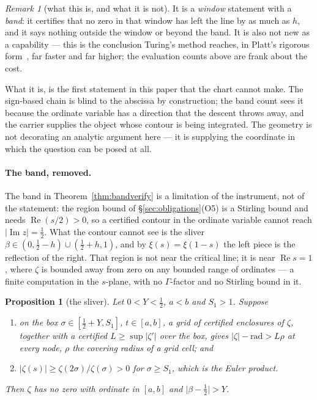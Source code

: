 \documentclass[11pt]{article}
\theoremstyle{plain}
\newtheorem{proposition}[theorem]{Proposition}
\theoremstyle{definition}
\theoremstyle{remark}
\newtheorem{remark}[theorem]{Remark}
\begin{document}
\begin{remark}[what this is, and what it is not]
It is a \emph{window} statement with a \emph{band}: it certifies that no zero in that
window has left the line by as much as $h$, and it says nothing outside the window or
beyond the band. It is also not new as a capability --- this is the conclusion Turing's
method reaches, in Platt's rigorous form~\cite{Platt2017}, far faster and far higher; the
evaluation counts above are frank about the cost.

What it is, is the first statement in this paper that the chart cannot make. The
sign-based chain is blind to the abscissa by construction; the band count sees it because
the ordinate variable has a direction that the descent throws away, and the carrier
supplies the object whose contour is being integrated. The geometry is not decorating an
analytic argument here --- it is supplying the coordinate in which the question can be
posed at all.
\end{remark}

\paragraph{The band, removed.} The band in Theorem~\ref{thm:bandverify} is a limitation of
the instrument, not of the statement: the region bound of \S\ref{sec:obligations}(O5) is a
Stirling bound and needs $\operatorname{Re}(s/2)>0$, so a certified contour in the ordinate
variable cannot reach $\lvert\operatorname{Im}z\rvert=\tfrac12$. What the contour cannot see
is the sliver $\beta\in(0,\tfrac12-h)\cup(\tfrac12+h,1)$, and by $\xi(s)=\xi(1-s)$ the left
piece is the reflection of the right. That region is not near the critical line; it is near
$\operatorname{Re}s=1$, where $\zeta$ is bounded away from zero on any bounded range of
ordinates --- a finite computation in the $s$-plane, with no $\Gamma$-factor and no Stirling
bound in it.

\begin{proposition}[the sliver]\label{prop:sliver}
Let $0<Y<\tfrac12$, $a<b$ and $S_1>1$. Suppose
\begin{enumerate}
\item[(a)] on the box $\sigma\in[\tfrac12+Y,S_1]$, $t\in[a,b]$, a grid of certified
enclosures of $\zeta$, together with a certified $L\ge\sup\lvert\zeta'\rvert$ over the
box, gives $\lvert\zeta\rvert-\mathrm{rad}>L\rho$ at every node, $\rho$ the covering
radius of a grid cell; and
\item[(b)] $\lvert\zeta(s)\rvert\ge\zeta(2\sigma)/\zeta(\sigma)>0$ for $\sigma\ge S_1$, which
is the Euler product.
\end{enumerate}
Then $\zeta$ has no zero with ordinate in $[a,b]$ and $\lvert\beta-\tfrac12\rvert>Y$.
\end{proposition}
\end{document}
